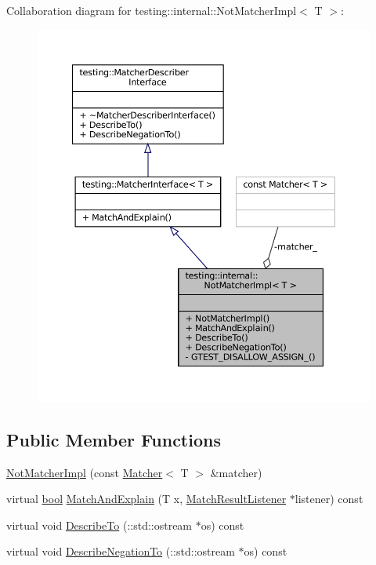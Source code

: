 Collaboration diagram for testing\+:\+:internal\+:\+:Not\+Matcher\+Impl$<$ T $>$\+:
\nopagebreak
\begin{figure}[H]
\begin{center}
\leavevmode
\includegraphics[width=350pt]{classtesting_1_1internal_1_1NotMatcherImpl__coll__graph}
\end{center}
\end{figure}
\subsection*{Public Member Functions}
\begin{DoxyCompactItemize}
\item 
\hyperlink{classtesting_1_1internal_1_1NotMatcherImpl_aaf35f72ebe8379f09169f4f0845cc663}{Not\+Matcher\+Impl} (const \hyperlink{classtesting_1_1Matcher}{Matcher}$<$ T $>$ \&matcher)
\item 
virtual \hyperlink{classbool}{bool} \hyperlink{classtesting_1_1internal_1_1NotMatcherImpl_aff3743d9ffcd6dc54b389b5e23caacf3}{Match\+And\+Explain} (T x, \hyperlink{classtesting_1_1MatchResultListener}{Match\+Result\+Listener} $\ast$listener) const
\item 
virtual void \hyperlink{classtesting_1_1internal_1_1NotMatcherImpl_a2c22d3e15126decd9c6af132d4f4b60f}{Describe\+To} (\+::std\+::ostream $\ast$os) const
\item 
virtual void \hyperlink{classtesting_1_1internal_1_1NotMatcherImpl_a960f799e25ba7264d0d45fa61bb9271c}{Describe\+Negation\+To} (\+::std\+::ostream $\ast$os) const
\end{DoxyCompactItemize}
